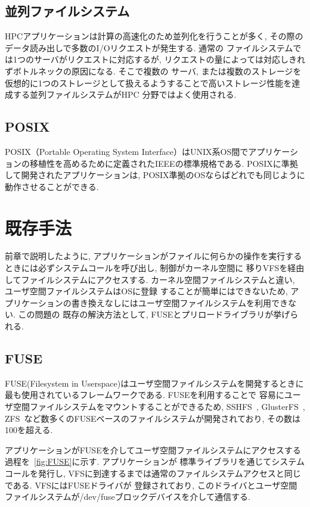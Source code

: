 \documentclass[a4paper,11pt]{jreport}
\begin{document}
\section{並列ファイルシステム}
HPCアプリケーションは計算の高速化のため並列化を行うことが多く, その際のデータ読み出しで多数のI/Oリクエストが発生する. 通常の
ファイルシステムでは1つのサーバがリクエストに対応するが, リクエストの量によっては対応しきれずボトルネックの原因になる. そこで複数の
サーバ, または複数のストレージを仮想的に1つのストレージとして扱えるようすることで高いストレージ性能を達成する並列ファイルシステムがHPC
分野ではよく使用される. 
\section{POSIX}
POSIX（Portable Operating System Interface）はUNIX系OS間でアプリケーションの移植性を高めるために定義されたIEEEの標準規格である.
POSIXに準拠して開発されたアプリケーションは, POSIX準拠のOSならばどれでも同じように動作させることができる.

\chapter{既存手法}
前章で説明したように, アプリケーションがファイルに何らかの操作を実行するときには必ずシステムコールを呼び出し, 制御がカーネル空間に
移りVFSを経由してファイルシステムにアクセスする. カーネル空間ファイルシステムと違い, ユーザ空間ファイルシステムはOSに登録
することが簡単にはできないため, アプリケーションの書き換えなしにはユーザ空間ファイルシステムを利用できない. この問題の
既存の解決方法として, FUSEとプリロードライブラリが挙げられる. 
\section{FUSE}
FUSE(Filesystem in Userspace)はユーザ空間ファイルシステムを開発するときに最も使用されているフレームワークである. FUSEを利用することで
容易にユーザ空間ファイルシステムをマウントすることができるため, SSHFS~\cite{hoskins2006sshfs}, GlusterFS~\cite{davies2013scale}, 
ZFS~\cite{rodeh2003zfs}など数多くのFUSEベースのファイルシステムが開発されており, その数は100を超える.

アプリケーションがFUSEを介してユーザ空間ファイルシステムにアクセスする過程を\figurename~\ref{fig:FUSE}に示す. アプリケーションが
標準ライブラリを通じてシステムコールを発行し, VFSに到達するまでは通常のファイルシステムアクセスと同じである. VFSにはFUSEドライバが
登録されており, このドライバとユーザ空間ファイルシステムが/dev/fuseブロックデバイスを介して通信する.
\end{document}
